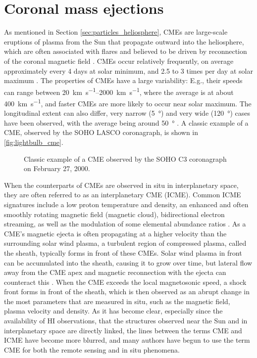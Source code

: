 \section{Coronal mass ejections}
\label{sec:cmes}

As mentioned in Section \ref{sec:particles_heliosphere}, \acp{CME} are large-scale eruptions of plasma from the Sun that propagate outward into the heliosphere, which are often associated with flares and believed to be driven by reconnection of the coronal magnetic field \citep[see e.g.][for discussions on the triggering mechanism]{Forbes-2000,Kusano-2012}. CMEs occur relatively frequently, on average approximately every 4 days at solar minimum, and 2.5 to 3 times per day at solar maximum \citep{Webb-1994}. The properties of CMEs have a large variability: E.g., their speeds can range between \SIrange[range-phrase={\,and\,}]{20}{2000}{\kilo\meter\per\second}, where the average is at about \SI{400}{\kilo\meter\per\second}, and faster CMEs are more likely to occur near solar maximum. The longitudinal extent can also differ, very narrow (\SI{5}{\degree}) and very wide (\SI{120}{\degree}) cases have been observed, with the average being around \SI{50}{\degree} \citep{Cane-2000}. A classic example of a CME, observed by the \ac{SOHO} \ac{LASCO} coronagraph, is shown in \autoref{fig:lightbulb_cme}.

\begin{figure}
    \centering
    
    \caption[Classic example of a \acs{CME}]{Classic example of a \ac{CME} observed by the \ac{SOHO} C3 coronagraph on February 27, 2000.}
    \label{fig:lightbulb_cme}
\end{figure}

When the counterparts of \acp{CME} are observed in situ in interplanetary space, they are often referred to as an interplanetary \ac{CME} (\acs{ICME}). Common \ac{ICME} signatures include a low proton temperature and density, an enhanced and often smoothly rotating magnetic field (magnetic cloud), bidirectional electron streaming, as well as the modulation of some elemental abundance ratios \citep{Richardson-Cane-1995,Zurbuchen-2006-insitu-signatures,Wimmer-Schweingruber2006}.
As a \ac{CME}'s magnetic ejecta is often propagating at a higher velocity than the surrounding solar wind plasma, a turbulent region of compressed plasma, called the sheath, typically forms in front of these \acp{CME}. Solar wind plasma in front can be accumulated into the sheath, causing it to grow over time, but lateral flow away from the CME apex and magnetic reconnection with the ejecta can counteract this \citep[see e.g.][]{Siscoe2008,Manchester2005,Janvier-2019}. When the \ac{CME} exceeds the local magnetosonic speed, a shock front forms in front of the sheath, which is then observed as an abrupt change in the most parameters that are measured in situ, such as the magnetic field, plasma velocity and density.
As it has become clear, especially since the availability of \ac{HI} observations, that the structures observed near the Sun and in interplanetary space are directly linked, the lines between the terms \ac{CME} and \ac{ICME} have become more blurred, and many authors have begun to use the term \ac{CME} for both the remote sensing and in situ phenomena.

